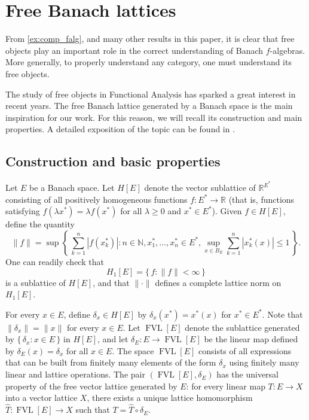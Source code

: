 \documentclass{memo-l}
\theoremstyle{definition}
\theoremstyle{remark}
\numberwithin{section}{chapter}
\numberwithin{equation}{chapter}
\newcommand\N{\ensuremath{\mathbb{N}}}
\newcommand\R{\ensuremath{\mathbb{R}}}
\newcommand{\falg}{$f\!$-algebra}
\newcommand{\FVLv}[1]{\operatorname{FVL}[#1]}
\begin{document}
\section{Free Banach lattices}\label{sec:background_FBL}

From \cref{ex:comp_falg}, and many other results in this paper, it is clear
that free objects play an important role in the correct understanding
of Banach \falg s. More generally, to properly understand any category, one must
understand its free objects.

The study of free objects in Functional Analysis has sparked a great
interest in recent years. The free Banach lattice generated by a
Banach space \cite{aviles_rodriguez_tradacete2018} is the main
inspiration for our work. For this reason, we will recall its
construction and main properties. A detailed exposition of the topic
can be found in \cite{oikhberg_etal2022}.

\subsection{Construction and basic properties}

Let $E$ be a Banach space. Let $H[E]$ denote the vector sublattice of
$\R^{E^{*}}$ consisting of all positively homogeneous functions
$f\colon E^{*}\to \R$ (that is, functions satisfying $f(\lambda
x^{*})=\lambda f(x^{*})$ for all $\lambda \ge 0$ and $x^{*} \in
E^{*}$). Given $f \in H[E]$, define the quantity
\[
\|f\|=\sup \left\{\, \sum_{k=1}^{n}|f(x_k^{*})| : n \in \N,
x_1^{*},\ldots ,x_n^{*}\in E^{*}, \sup_{x \in
B_E}\sum_{k=1}^{n}|x_k^{*}(x)|\le 1 \,\right\}.
\]
One can readily check that
\[
    H_1[E]=\{\, f :  \|f\|<\infty \, \}
\]
is a sublattice of $H[E]$, and that $\|{\cdot }\|$ defines a complete
lattice norm on $H_1[E]$.

For every $x \in E$, define $\delta _x \in H[E]$ by $\delta
_x(x^{*})=x^{*}(x)$ for $x ^{*}\in E^{*}$. Note that $\|\delta
_x\|=\|x\|$ for every $x \in E$. Let $\FVLv E$ denote the sublattice
generated by $\{\, \delta _x : x \in E \, \} $ in $H[E]$, and let
$\delta_E \colon E\to \FVLv E$ be the linear map defined by $\delta_E (x)=\delta _x$ for
all $x \in E$. The space
$\FVLv E$ consists of all expressions that can be built from
finitely many elements of the form $\delta _x$ using finitely many
linear and lattice operations. The pair $(\FVLv E,\delta _E)$ has the universal property of the
free vector lattice generated by $E$: for every linear map $T\colon
E\to X$ into a vector lattice $X$, there exists a unique lattice
homomorphism $\hat{T}\colon \FVLv E\to X$ such that $T=\hat{T}\circ\delta_E
$.
\end{document}
